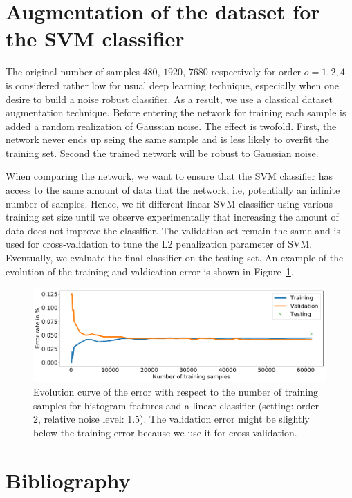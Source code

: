 \documentclass[final,twocolumn,3p,times,authoryear]{elsarticle}
\newcommand{\figref}[1]{Figure~\ref{fig:#1}}
\newcommand{\1}{\b{1}}              %
\newcommand{\0}{\b{0}}              %
\begin{document}
\section{Augmentation of the dataset for the SVM classifier}
\label{sec:dataset_augmentation} The original number of samples $480$, $1920$,
$7680$ respectively for order $o=1,2,4$ is considered rather low for usual
deep learning technique, especially when one desire to build a noise robust
classifier. As a result, we use a classical dataset augmentation technique.
Before entering the network for training each sample is added a random
realization of Gaussian noise. The effect is twofold. First, the network never
ends up seing the same sample and is less likely to overfit the training set.
Second the trained network will be robust to Gaussian noise.

When comparing the network, we want to ensure that the SVM classifier has
access to the same amount of data that the network, i.e, potentially an
infinite number of samples. Hence, we fit different linear SVM classifier using
various training set size until we observe experimentally that
increasing the amount of data does not improve the classifier. The validation
set remain the same and is used for cross-validation to tune the L2
penalization parameter of SVM. Eventually, we evaluate the final classifier on
the testing set. An example of the evolution of the training and valdication
error is shown in \figref{hist_error_evolution}.

\begin{figure}[!ht]
\centering
\includegraphics[width=\linewidth]{hist_error_order2_noise1_5}
\caption{Evolution curve of the error with respect to the number of training samples for histogram features and a linear classifier (setting: order 2, relative noise level: 1.5). The validation error might be slightly below the training error because we use it for cross-validation.}
\label{fig:hist_error_evolution}
\end{figure}

\section*{Bibliography}


\end{document}
